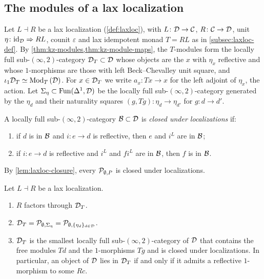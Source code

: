 \subsection{The modules of a lax localization}
\label{subsec:laxloc-description}

%
Let $L \dashv R$ be a lax localization (\cref{def:laxloc}), with
$L\colon \mathcal{D} \to \mathcal{C}$,
$R\colon \mathcal{C} \to \mathcal{D}$,
unit
$\eta\colon \mathrm{id}_{\mathcal{D}} \Rightarrow RL$,
counit $\varepsilon$ and lax idempotent monad $T = RL$ as in
\cref{subsec:laxloc-def}. By
\cref{thm:kz-modules,thm:kz-module-maps}, the $T$-modules form the locally full
sub-$(\infty,2)$-category
$\mathcal{D}_{T} \subset \mathcal{D}$
whose objects are the $x$ with $\eta_{x}$ reflective and whose $1$-morphisms
are those with left Beck--Chevalley unit square, and
$\iota_{1}\mathcal{D}_{T} \simeq {\operatorname{Mod}_{T}\left(\mathcal{D}\right)}$.
For $x \in \mathcal{D}_{T}$ we write
$a_{x}\colon Tx \to x$
for the left adjoint of $\eta_{x}$, the action.
Let
$\Sigma_{\eta} \subset \operatorname{Fun}(\Delta^{1},\mathcal{D})$
be the locally full sub-$(\infty,2)$-category generated by the $\eta_{d}$ and
their naturality squares
$(g,Tg)\colon \eta_{d} \to \eta_{d'}$
for $g\colon d \to d'$.

\begin{defi}
\label{def:closed-loc}
%
A locally full sub-$(\infty,2)$-category
$\mathcal{B} \subset \mathcal{D}$
is \emph{closed under localizations} if:
\begin{enumerate}
\item[(R1)] if $d$ is in $\mathcal{B}$ and $i\colon e \to d$ is reflective, then $e$ and
$i^{L}$ are in $\mathcal{B}$;
\item[(R2)] if $i\colon e \to d$ is reflective and $i^{L}$ and $fi^{L}$ are in
$\mathcal{B}$, then $f$ is in $\mathcal{B}$.
\end{enumerate}
\end{defi}

%
By \cref{lem:laxloc-closure}, every $\mathcal{P}_{\emptyset,P}$ is closed under
localizations.

\begin{thm}
\label{thm:laxloc-local}
%
Let $L \dashv R$ be a lax localization.
\begin{enumerate}
\item $R$ factors through $\mathcal{D}_{T}$.
\item
$\mathcal{D}_{T} = \mathcal{P}_{\emptyset,\Sigma_{\eta}} =
\mathcal{P}_{\emptyset,\{\eta_{d}\}_{d \in \mathcal{D}}}$.
\item $\mathcal{D}_{T}$ is the smallest locally full sub-$(\infty,2)$-category of $\mathcal{D}$
that contains the free modules $Td$ and the $1$-morphisms $Tg$ and is closed
under localizations. In particular, an object of $\mathcal{D}$ lies in $\mathcal{D}_{T}$ if and
only if
it admits
a reflective $1$-morphism to some $Rc$.
\end{enumerate}
\end{thm}

